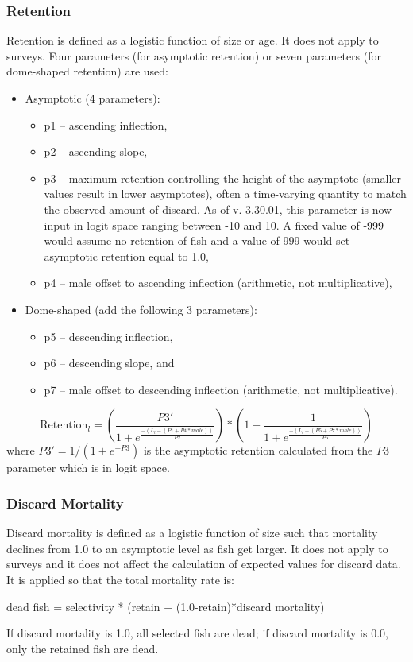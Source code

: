 \subsubsection{Retention}
Retention is defined as a logistic function of size or age.  It does not apply to surveys.  Four parameters (for asymptotic retention) or seven parameters (for dome-shaped retention) are used:
\begin{itemize}
	\item Asymptotic (4 parameters):
	\begin{itemize}
		\item p1 – ascending inflection,
		\item p2 – ascending slope,
		\item p3 – maximum retention controlling the height of the asymptote (smaller values result in lower asymptotes), often a time-varying quantity to match the observed amount of discard. As of v. 3.30.01, this parameter is now input in logit space ranging between -10 and 10. A fixed value of -999 would assume no retention of fish and a value of 999 would set asymptotic retention equal to 1.0,
		\item p4 – male offset to ascending inflection (arithmetic, not multiplicative),
	\end{itemize}
	\item Dome-shaped (add the following 3 parameters):
	\begin{itemize}
		\item p5 – descending inflection,
		\item p6 – descending slope, and
		\item p7 – male offset to descending inflection (arithmetic, not multiplicative).
	\end{itemize}
\end{itemize}

\begin{equation}
	\text{Retention}_l = \left(\frac{P3'}{1 + e^{\frac{-(L_l-(P1+P4*male))}{P2}}}\right)*\left(1 - \frac{1}{1 + e^{\frac{-(L_l-(P5+P7*male))}{P6}}}\right)
\end{equation}
where $P3' = 1/(1+e^{-P3})$ is the asymptotic retention calculated from the $P3$ parameter which is in logit space.

\subsubsection{Discard Mortality}
Discard mortality is defined as a logistic function of size such that mortality declines from 1.0 to an asymptotic level as fish get larger.  It does not apply to surveys and it does not affect the calculation of expected values for discard data.   It is applied so that the total mortality rate is:
\begin{center}
	dead fish = selectivity * (retain + (1.0-retain)*discard mortality)
\end{center}
If discard mortality is 1.0, all selected fish are dead; if discard mortality is 0.0, only the retained fish are dead.

